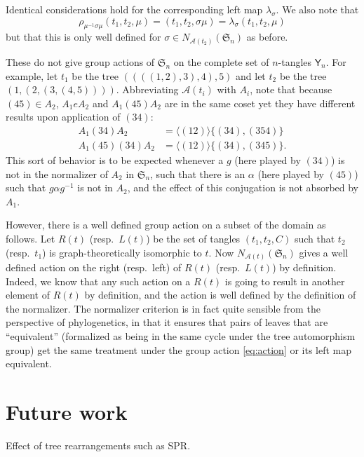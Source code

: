 \documentclass{amsart}
\newcommand{\fS}{\mathfrak S}
\newcommand{\aut}{\mathcal A}
\newcommand{\pairing}{\mu}
\newcommand{\tangle}{\mathsf{Y}}
\begin{document}
Identical considerations hold for the corresponding left map $\lambda_\sigma$.
We also note that
\[
\rho_{\pairing^{-1} \sigma \pairing} (t_1, t_2, \pairing) =
(t_1, t_2, \sigma \pairing) =
\lambda_{\sigma} (t_1, t_2, \pairing)
\]
but that this is only well defined for $\sigma \in N_{\aut(t_2)}(\fS_n)$ as before.

These do not give group actions of $\fS_n$ on the complete set of $n$-tangles $\tangle_n$.
For example, let $t_1$ be the tree $((((1,2),3),4),5)$ and let $t_2$ be the tree $(1,(2,(3,(4,5))))$.
Abbreviating $\aut(t_i)$ with $A_i$, note that because $(4 5) \in A_2$, $A_1 e A_2$ and $A_1 (4 5) A_2$ are in the same coset yet they have different results upon application of $(3 4)$:
\begin{align*}
A_1 (3 4) A_2 & = \langle (1 2) \rangle \{(3 4), (3 5 4)\} \\
A_1 (4 5) (3 4) A_2 & = \langle (1 2) \rangle \{(3 4), (3 4 5)\}.
\end{align*}
This sort of behavior is to be expected whenever a $g$ (here played by $(3 4)$) is not in the normalizer of $A_2$ in $\fS_n$, such that there is an $\alpha$ (here played by $(4 5)$) such that $g \alpha g^{-1}$ is not in $A_2$, and the effect of this conjugation is not absorbed by $A_1$.

However, there is a well defined group action on a subset of the domain as follows.
Let $R(t)$ (resp.\ $L(t)$) be the set of tangles $(t_1, t_2, C)$ such that $t_2$ (resp.\ $t_1$) is graph-theoretically isomorphic to $t$.
Now $N_{\aut(t)}(\fS_n)$ gives a well defined action on the right (resp.\ left) of $R(t)$ (resp.\ $L(t)$) by definition.
Indeed, we know that any such action on a $R(t)$ is going to result in another element of $R(t)$ by definition, and the action is well defined by the definition of the normalizer.
The normalizer criterion is in fact quite sensible from the perspective of phylogenetics, in that it ensures that pairs of leaves that are ``equivalent'' (formalized as being in the same cycle under the tree automorphism group) get the same treatment under the group action \eqref{eq:action} or its left map equivalent.


\section{Future work}
Effect of tree rearrangements such as SPR.
\end{document}
